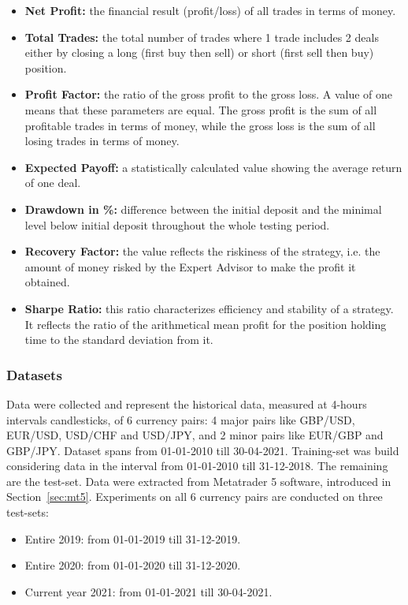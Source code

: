\begin{itemize}
\setlength\itemsep{0.3em}
\item \textbf{Net Profit:} the financial result (profit/loss) of all trades in terms of money.
\item \textbf{Total Trades:} the total number of trades where 1 trade includes 2 deals either by closing a long (first buy then sell) or short (first sell then buy) position.
\item \textbf{Profit Factor:} the ratio of the gross profit to the gross loss. A value of one means that these parameters are equal. The gross profit is the sum of all profitable trades in terms of money, while the gross loss is the sum of all losing trades in terms of money.
\item \textbf{Expected Payoff:} a statistically calculated value showing the average return of one deal. 
\item \textbf{Drawdown in \%:} difference between the initial deposit and the minimal level below initial deposit throughout the whole testing period.
\item \textbf{Recovery Factor:} the value reflects the riskiness of the strategy, i.e. the amount of money risked by the Expert Advisor to make the profit it obtained.
\item \textbf{Sharpe Ratio:} this ratio characterizes efficiency and stability of a strategy. It reflects the ratio of the arithmetical mean profit for the position holding time to the standard deviation from it.
\end{itemize}

\subsubsection{Datasets}
Data were collected and represent the historical data, measured at 4-hours intervals candlesticks, of 6 currency pairs: 4 major pairs like GBP/USD, EUR/USD, USD/CHF and USD/JPY, and 2 minor pairs like EUR/GBP and GBP/JPY.
Dataset spans from 01-01-2010 till 30-04-2021. Training-set was build considering data in the interval from 01-01-2010 till 31-12-2018. The remaining are the test-set. Data were extracted from Metatrader 5 software, introduced in Section~\ref{sec:mt5}. 
Experiments on all 6 currency pairs are conducted on three test-sets:
\begin{itemize}
\setlength\itemsep{0.3em}
\item Entire 2019: from 01-01-2019 till 31-12-2019.
\item Entire 2020: from 01-01-2020 till 31-12-2020.
\item Current year 2021: from 01-01-2021 till 30-04-2021.
\end{itemize}

